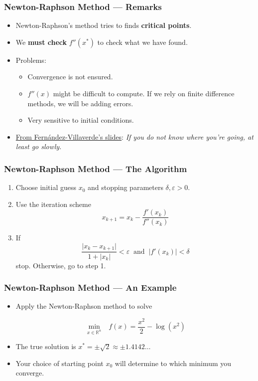\documentclass[11pt,xcolor={svgnames},aspectratio=169,usepdftitle=false]{beamer}
\begin{document}
\begin{frame}
  \frametitle{Newton-Raphson Method --- Remarks}
\begin{itemize}
  \item Newton-Raphson's method tries to finds \alert{\textbf{critical points}}.
  \item We \alert{\textbf{must check}} $f''(x^*)$ to check what we have found.
  \item Problems:
  \begin{itemize}
    \item Convergence is not ensured.
    \item $f''(x)$ might be difficult to compute. If we rely on finite difference methods, we will be adding errors.
    \item Very sensitive to initial conditions.
  \end{itemize}
  \item \href{https://www.sas.upenn.edu/~jesusfv/Lecture_NM_2_Optimization.pdf}{From Fern\'andez-Villaverde's slides}:
  \textit{If you do not know where you're going, at least go slowly.}
\end{itemize}
\end{frame}

\begin{frame}
  \frametitle{Newton-Raphson Method --- The Algorithm}
\begin{enumerate}
  \item Choose initial guess $x_0$ and stopping parameters $\delta,\varepsilon > 0$.
  \item Use the iteration scheme
  \[
  x_{k+1} = x_k - \frac{f'(x_k)}{f''(x_k)}
  \]
  \item If
    \[
    \frac{\lvert x_k - x_{k+1}\rvert}{1 + \lvert x_k \rvert} < \varepsilon \ \text{ and } \ \lvert f'(x_k)\rvert < \delta
    \]
  stop. Otherwise, go to step 1.
\end{enumerate}
\end{frame}

\begin{frame}
  \frametitle{Newton-Raphson Method --- An Example}

\begin{itemize}
  \item Apply the Newton-Raphson method to solve 

  \[
  \underset{x\in\mathbb{R}^n}{\min} \phantom{\Omega} f(x) = \frac{x^2}{2} - \log(x^2)
  \]
  \item The true solution is $x^* = \pm \sqrt{2} \approx \pm 1.4142\ldots$
  \item Your choice of starting point $x_0$ will determine to which minimum you converge.
\end{itemize}
\end{frame}
\end{document}
